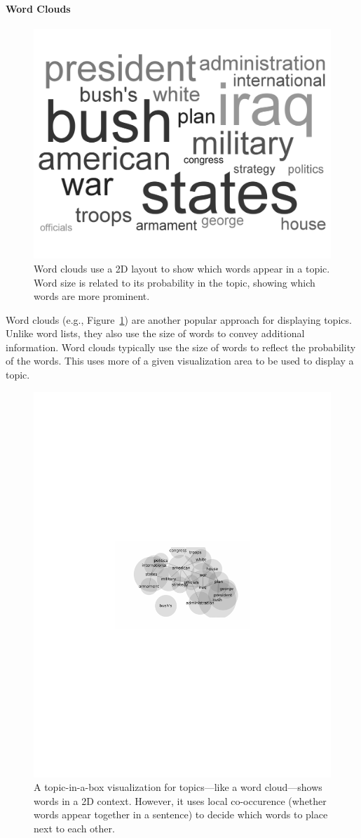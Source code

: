 \paragraph{Word Clouds}

\begin{figure}
  \begin{center}
    \includegraphics[width=.5\linewidth]{figures/wordcloud_20}
  \end{center}
  \caption{Word clouds use a 2D layout to show which words appear in a
  topic.  Word size is related to its probability in the topic,
  showing which words are more prominent.}
  \label{fig:word-cloud}
\end{figure}

Word clouds (e.g., Figure~\ref{fig:word-cloud}) are another popular approach for
displaying topics.  Unlike word lists, they also use the size of words to convey
additional information. Word clouds typically use the size of words to reflect
the probability of the words.  This uses more of a given visualization area to
be used to display a topic.

\begin{figure}
  \begin{center}
    \includegraphics[width=.5\linewidth]{figures/topic_in_a_box_20}
  \end{center}
  \caption{A topic-in-a-box visualization for topics---like a word
    cloud---shows words in a 2D context.  However, it uses local
    co-occurence (whether words appear together in a sentence) to decide which words to place next to each other.}
  \label{fig:topic-in-a-box}
\end{figure}

